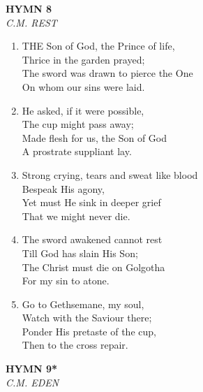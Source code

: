 \documentclass[11pt,a4paper]{article}
\begin{document}
\newpage
\begin{center}
    {\Large \textbf{HYMN 8}}
    \\
    \textit{C.M. REST}
\end{center}
\vspace{1em}

\begin{enumerate}
    \item THE Son of God, the Prince of life, \\
        Thrice in the garden prayed; \\
        The sword was drawn to pierce the One \\
        On whom our sins were laid.

    \item He asked, if it were possible, \\
        The cup might pass away; \\
        Made flesh for us, the Son of God \\
        A prostrate suppliant lay.

    \item Strong crying, tears and sweat like blood \\
        Bespeak His agony, \\
        Yet must He sink in deeper grief \\
        That we might never die.

    \item The sword awakened cannot rest \\
        Till God has slain His Son; \\
        The Christ must die on Golgotha \\
        For my sin to atone.

    \item Go to Gethsemane, my soul, \\
        Watch with the Saviour there; \\
        Ponder His pretaste of the cup, \\
        Then to the cross repair.

\end{enumerate}

\newpage
\begin{center}
    {\Large \textbf{HYMN 9*}}
    \\
    \textit{C.M. EDEN}
\end{center}
\vspace{1em}
\end{document}
